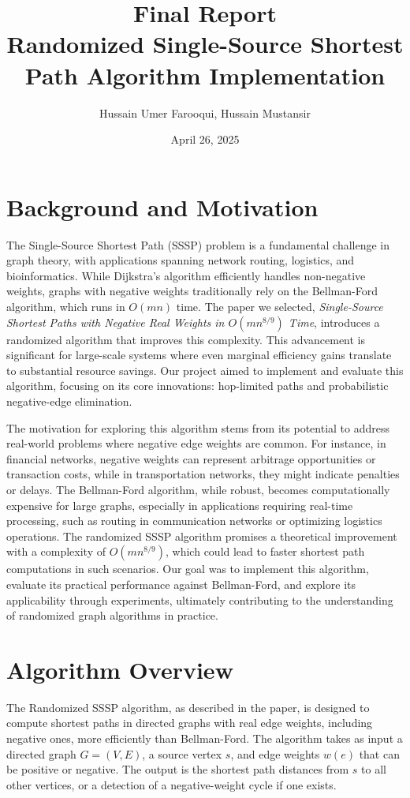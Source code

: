 \documentclass[12pt]{article}
\title{Final Report \\
Randomized Single-Source Shortest Path Algorithm Implementation}
\author{Hussain Umer Farooqui, Hussain Mustansir}
\date{April 26, 2025}
\begin{document}
\maketitle

\section{Background and Motivation}
The Single-Source Shortest Path (SSSP) problem is a fundamental challenge in graph theory, with applications spanning network routing, logistics, and bioinformatics. While Dijkstra's algorithm efficiently handles non-negative weights, graphs with negative weights traditionally rely on the Bellman-Ford algorithm, which runs in \(O(mn)\) time. The paper we selected, \textit{Single-Source Shortest Paths with Negative Real Weights in \(O(mn^{8/9})\) Time}, introduces a randomized algorithm that improves this complexity. This advancement is significant for large-scale systems where even marginal efficiency gains translate to substantial resource savings. Our project aimed to implement and evaluate this algorithm, focusing on its core innovations: hop-limited paths and probabilistic negative-edge elimination.

The motivation for exploring this algorithm stems from its potential to address real-world problems where negative edge weights are common. For instance, in financial networks, negative weights can represent arbitrage opportunities or transaction costs, while in transportation networks, they might indicate penalties or delays. The Bellman-Ford algorithm, while robust, becomes computationally expensive for large graphs, especially in applications requiring real-time processing, such as routing in communication networks or optimizing logistics operations. The randomized SSSP algorithm promises a theoretical improvement with a complexity of \(O(mn^{8/9})\), which could lead to faster shortest path computations in such scenarios. Our goal was to implement this algorithm, evaluate its practical performance against Bellman-Ford, and explore its applicability through experiments, ultimately contributing to the understanding of randomized graph algorithms in practice.

\section{Algorithm Overview}
The Randomized SSSP algorithm, as described in the paper, is designed to compute shortest paths in directed graphs with real edge weights, including negative ones, more efficiently than Bellman-Ford. The algorithm takes as input a directed graph \(G = (V, E)\), a source vertex \(s\), and edge weights \(w(e)\) that can be positive or negative. The output is the shortest path distances from \(s\) to all other vertices, or a detection of a negative-weight cycle if one exists.
\end{document}
